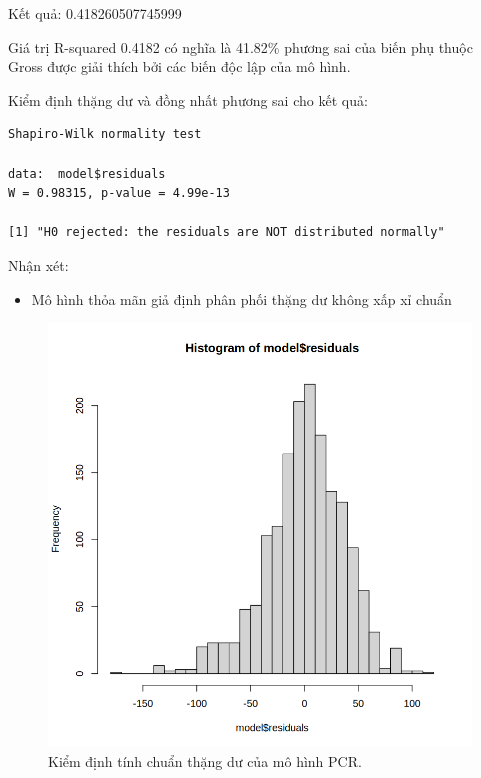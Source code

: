 Kết quả: 0.418260507745999

Giá trị R-squared 0.4182 có nghĩa là 41.82\% phương sai của biến phụ thuộc Gross được giải thích bởi các biến độc lập của mô hình.

Kiểm định thặng dư và đồng nhất phương sai cho kết quả:
\begin{lstlisting}
Shapiro-Wilk normality test

data:  model$residuals
W = 0.98315, p-value = 4.99e-13

[1] "H0 rejected: the residuals are NOT distributed normally"
\end{lstlisting}
Nhận xét:
\begin{itemize}
    \item Mô hình thỏa mãn giả định phân phối thặng dư không xấp xỉ chuẩn
\end{itemize}
\begin{figure}[H]
    \centering
    \includegraphics[width=0.75\columnwidth]{csm_figures/pcr_normality_test.png}
    \caption{Kiểm định tính chuẩn thặng dư của mô hình PCR.}
    \label{fig:pcr_normality_test}
\end{figure}

